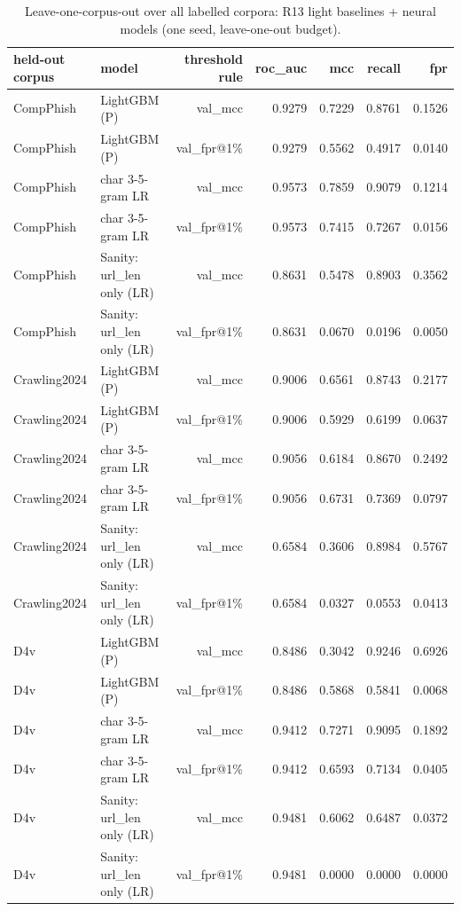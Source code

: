 \begin{table}[t]
\centering
\scriptsize
\caption{Leave-one-corpus-out over all labelled corpora: R13 light baselines + neural models (one seed, leave-one-out budget).}
\label{tab:rev_R17_loco_all_corpora_with_neural}
\begin{tabular}{llrrrrr}
\toprule
held-out corpus & model & threshold rule & roc\_auc & mcc & recall & fpr \\
\midrule
CompPhish & LightGBM (P) & val\_mcc & 0.9279 & 0.7229 & 0.8761 & 0.1526 \\
CompPhish & LightGBM (P) & val\_fpr@1\% & 0.9279 & 0.5562 & 0.4917 & 0.0140 \\
CompPhish & char 3-5-gram LR & val\_mcc & 0.9573 & 0.7859 & 0.9079 & 0.1214 \\
CompPhish & char 3-5-gram LR & val\_fpr@1\% & 0.9573 & 0.7415 & 0.7267 & 0.0156 \\
CompPhish & Sanity: url\_len only (LR) & val\_mcc & 0.8631 & 0.5478 & 0.8903 & 0.3562 \\
CompPhish & Sanity: url\_len only (LR) & val\_fpr@1\% & 0.8631 & 0.0670 & 0.0196 & 0.0050 \\
Crawling2024 & LightGBM (P) & val\_mcc & 0.9006 & 0.6561 & 0.8743 & 0.2177 \\
Crawling2024 & LightGBM (P) & val\_fpr@1\% & 0.9006 & 0.5929 & 0.6199 & 0.0637 \\
Crawling2024 & char 3-5-gram LR & val\_mcc & 0.9056 & 0.6184 & 0.8670 & 0.2492 \\
Crawling2024 & char 3-5-gram LR & val\_fpr@1\% & 0.9056 & 0.6731 & 0.7369 & 0.0797 \\
Crawling2024 & Sanity: url\_len only (LR) & val\_mcc & 0.6584 & 0.3606 & 0.8984 & 0.5767 \\
Crawling2024 & Sanity: url\_len only (LR) & val\_fpr@1\% & 0.6584 & 0.0327 & 0.0553 & 0.0413 \\
D4v & LightGBM (P) & val\_mcc & 0.8486 & 0.3042 & 0.9246 & 0.6926 \\
D4v & LightGBM (P) & val\_fpr@1\% & 0.8486 & 0.5868 & 0.5841 & 0.0068 \\
D4v & char 3-5-gram LR & val\_mcc & 0.9412 & 0.7271 & 0.9095 & 0.1892 \\
D4v & char 3-5-gram LR & val\_fpr@1\% & 0.9412 & 0.6593 & 0.7134 & 0.0405 \\
D4v & Sanity: url\_len only (LR) & val\_mcc & 0.9481 & 0.6062 & 0.6487 & 0.0372 \\
D4v & Sanity: url\_len only (LR) & val\_fpr@1\% & 0.9481 & 0.0000 & 0.0000 & 0.0000 \\

\end{tabular}
\end{table}
